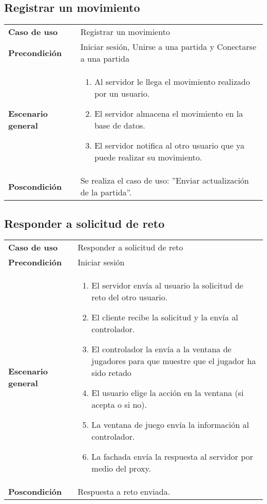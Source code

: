 \subsection{Registrar un movimiento}

{\footnotesize
\begin{tabularx}{0.95\textwidth}{p{}|X}

\textbf{Caso de uso} & Registrar un movimiento \\

\textbf{Precondición} & Iniciar sesión, Unirse a una partida y Conectarse a una
partida \\

\textbf{Escenario general} & \begin{enumerate}
\item Al servidor le llega el movimiento realizado por un usuario.
\item El servidor almacena el movimiento en la base de datos.
\item El servidor notifica al otro usuario que ya puede realizar su movimiento.
\end{enumerate} \\

\textbf{Poscondición} & Se realiza el caso de uso: ''Enviar actualización de la
partida''.\\

\end{tabularx}
}

\subsection{Responder a solicitud de reto}
{\footnotesize
\begin{tabularx}{0.95\textwidth}{p{}|X}

\textbf{Caso de uso} & Responder a solicitud de reto \\

\textbf{Precondición} & Iniciar sesión\\

\textbf{Escenario general} & \begin{enumerate}
\item El servidor envía al usuario la solicitud de reto del otro usuario.
\item El cliente recibe la solicitud y la envía al controlador.
\item El controlador la envía a la ventana de jugadores para que muestre que el jugador ha sido retado
\item El usuario elige la acción en la ventana (si acepta o si no).
\item La ventana de juego envía la información al controlador.
\item La fachada envía la respuesta al servidor por medio del proxy.
\end{enumerate} \\

\textbf{Poscondición} & Respuesta a reto enviada.

\end{tabularx}
}

